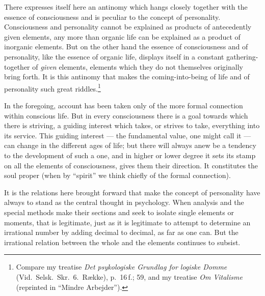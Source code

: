 \documentclass[12pt,a4paper]{book}
\newcommand{\opage}[1]{\marginnote{\footnotesize\textit{[#1]}}}
\begin{document}
There expresses itself here an antinomy which hangs closely together with the
essence of consciousness and is peculiar to the concept of personality.
Consciousness and personality cannot be explained as products of antecedently
given elements, any more than organic life can be explained as a product of
inorganic elements. But on the other hand the essence of consciousness and of
personality, like the essence of organic life, \opage{10}displays itself in a constant
gathering-together of \emph{given} elements, elements which they do not
themselves originally bring forth. It is this antinomy that makes the
coming-into-being of life and of personality such great riddles.\footnote{%
Compare my treatise \textit{Det psykologiske Grundlag for logiske Domme}
(Vid.~Selsk.~Skr.\ 6.~Række), p.~16\,f.; 59, and my treatise \textit{Om
Vitalisme} (reprinted in ``Mindre Arbejder'').}

In the foregoing, account has been taken only of the more formal connection
within conscious life. But in every consciousness there is a goal towards which
there is striving, a guiding interest which takes, or strives to take,
everything into its service. This guiding interest --- the fundamental value,
one might call it --- can change in the different ages of life; but there will
always anew be a tendency to the development of such a one, and in higher or
lower degree it sets its stamp on all the elements of consciousness, gives them
their direction. It constitutes the soul proper (when by ``spirit'' we think
chiefly of the formal connection).

It is the relations here brought forward that make the concept of personality
have always to stand as the central thought in psychology. When analysis and the
special methods make their sections and seek to isolate single elements or
moments, that is legitimate, just as it is legitimate to attempt to determine an
irrational number by adding decimal to decimal, as far as one can. But the
irrational relation between the whole and the elements continues to subsist.
\end{document}
